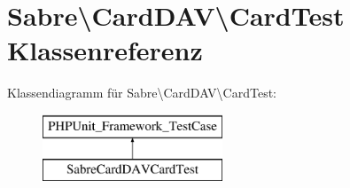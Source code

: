 \hypertarget{class_sabre_1_1_card_d_a_v_1_1_card_test}{}\section{Sabre\textbackslash{}Card\+D\+AV\textbackslash{}Card\+Test Klassenreferenz}
\label{class_sabre_1_1_card_d_a_v_1_1_card_test}
Klassendiagramm für Sabre\textbackslash{}Card\+D\+AV\textbackslash{}Card\+Test\+:\begin{figure}[H]
\begin{center}
\leavevmode
\includegraphics[height=2.000000cm]{class_sabre_1_1_card_d_a_v_1_1_card_test}
\end{center}
\end{figure}
